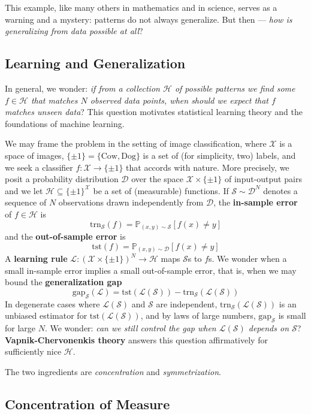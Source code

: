 \documentclass[twocolumn]{article}
\newcommand{\PP}{\mathbb{P}}
\newcommand{\Dd}{\mathcal{D}}
\newcommand{\Ee}{\mathcal{E}}
\newcommand{\Hh}{\mathcal{H}}
\newcommand{\Ll}{\mathcal{L}}
\newcommand{\Ss}{\mathcal{S}}
\newcommand{\Uu}{\mathcal{U}}
\newcommand{\Xx}{\mathcal{X}}
\newcommand{\Ein} {\text{trn}_{\Ss}} %
\newcommand{\Egap}{\text{gap}_{\Ss}}
\newcommand{\Eout}{\text{tst}} %
\theoremstyle{definition}
\begin{document}
    This example, like many others in mathematics and in science, serves as a
    warning and a mystery: patterns do not always generalize.  But then ---
    \emph{how is generalizing from data possible at all}? 

    \subsection*{Learning and Generalization}

    In general, we wonder: \emph{if from a collection $\Hh$ of possible
    patterns we find some $f\in \Hh$ that matches $N$ observed data points,
    when should we expect that $f$ matches unseen data}?  This question
    motivates statistical learning theory and the foundations of machine
    learning.
    
    We may frame the problem in the setting of image classification,
    where $\Xx$ is a space of images, $\{\pm 1\} = \{\text{Cow}, \text{Dog}\}$ is
    a set of (for simplicity, two) labels, and we seek a classifier
    $f: \Xx\to\{\pm 1\}$ that accords with nature.
    More precisely, we posit a probability distribution $\Dd$ over the space
    $\Xx\times \{\pm 1\}$ of input-output pairs and we let $\Hh \subseteq \{\pm
    1\}^\Xx$ be a set of (measurable) functions.  If $\Ss \sim \Dd^N$ denotes a
    sequence of $N$ observations drawn independently from $\Dd$, the
    \textbf{in-sample error} of $f\in \Hh$ is 
    $$
        \Ein(f) = \PP_{(x,y)\sim \Ss}[f(x)\neq y] 
    $$
    and the \textbf{out-of-sample error} is 
    $$
        \Eout(f) = \PP_{(x,y)\sim \Dd}[f(x)\neq y] 
    $$
    A \textbf{learning rule} $\Ll: (\Xx\times\{\pm 1\})^N \to \Hh$ maps
    $\Ss$s to $f$s.  We wonder when a small in-sample error implies a
    small out-of-sample error, that is, when we may bound the
    \textbf{generalization gap} 
    $$
        \Egap(\Ll) = \Eout(\Ll(\Ss)) - \Ein(\Ll(\Ss)) 
    $$
    In degenerate cases where $\Ll(\Ss)$ and $\Ss$ are independent, $\Ein(\Ll(\Ss))$ is
    an unbiased estimator for $\Eout(\Ll(\Ss))$, and by laws of large numbers, $\Egap$ is
    small for large $N$.  We wonder: \emph{can we still control the gap when
    $\Ll(\Ss)$ depends on
    $\Ss$}?
    \textbf{Vapnik-Chervonenkis theory} answers this question affirmatively for
    sufficiently nice $\Hh$.

    The two ingredients are \emph{concentration} and \emph{symmetrization}.

    \subsection*{Concentration of Measure}
\end{document}
